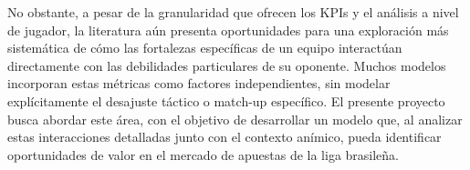 No obstante, a pesar de la granularidad que ofrecen los KPIs y el análisis a nivel de jugador, la literatura aún presenta oportunidades para una exploración más sistemática de cómo las fortalezas específicas de un equipo interactúan directamente con las debilidades particulares de su oponente. Muchos modelos incorporan estas métricas como factores independientes, sin modelar explícitamente el desajuste táctico o match-up específico. El presente proyecto busca abordar este área, con el objetivo de desarrollar un modelo que, al analizar estas interacciones detalladas junto con el contexto anímico, pueda identificar oportunidades de valor en el mercado de apuestas de la liga brasileña.
